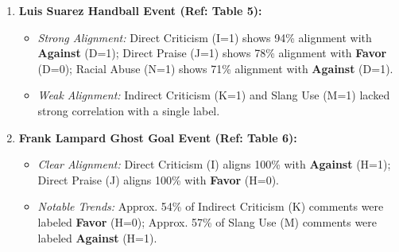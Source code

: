 \documentclass[sigconf, review]{acmart}
\begin{document}
\begin{enumerate}
\begin{enumerate}
                    \item \textbf{Luis Suarez Handball Event (Ref: Table 5):}
                        \begin{itemize}
                            \item \textit{Strong Alignment:} Direct Criticism (I=1) shows 94\% alignment with \textbf{Against} (D=1); Direct Praise (J=1) shows 78\% alignment with \textbf{Favor} (D=0); Racial Abuse (N=1) shows 71\% alignment with \textbf{Against} (D=1).
                            \item \textit{Weak Alignment:} Indirect Criticism (K=1) and Slang Use (M=1) lacked strong correlation with a single label.
                        \end{itemize}

                    \item \textbf{Frank Lampard Ghost Goal Event (Ref: Table 6):}
                         \begin{itemize}
                            \item \textit{Clear Alignment:} Direct Criticism (I) aligns 100\% with \textbf{Against} (H=1); Direct Praise (J) aligns 100\% with \textbf{Favor} (H=0).
                            \item \textit{Notable Trends:} Approx. 54\% of Indirect Criticism (K) comments were labeled \textbf{Favor} (H=0); Approx. 57\% of Slang Use (M) comments were labeled \textbf{Against} (H=1).
                        \end{itemize}

        \end{enumerate} %
    

\end{enumerate}

    

\end{document}
